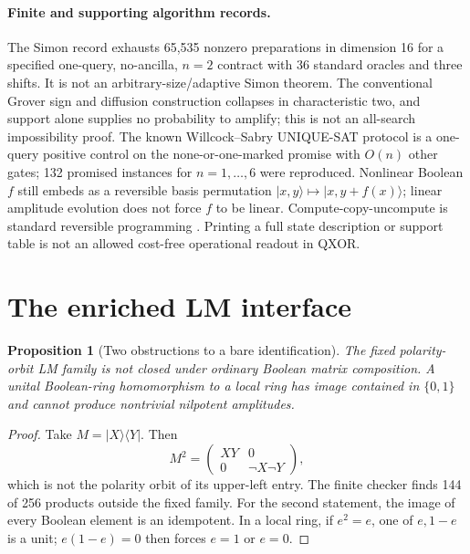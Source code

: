 \documentclass[11pt]{article}
\newtheorem{proposition}[theorem]{Proposition}
\theoremstyle{remark}
\begin{document}
\paragraph{Finite and supporting algorithm records.}
The Simon record exhausts 65,535 nonzero preparations in dimension 16 for a
specified one-query, no-ancilla, $n=2$ contract with 36 standard oracles and
three shifts. It is not an arbitrary-size/adaptive Simon theorem. The
conventional Grover sign and diffusion construction collapses in characteristic
two, and support alone supplies no probability to amplify; this is not an
all-search impossibility proof. The known Willcock--Sabry UNIQUE-SAT protocol
\cite{WillcockSabry2011} is a one-query positive control on the none-or-one-marked
promise with $O(n)$ other gates; 132 promised instances for $n=1,\ldots,6$ were
reproduced. Nonlinear Boolean $f$ still embeds as a reversible basis permutation
$\lvert x,y\rangle\mapsto\lvert x,y+f(x)\rangle$; linear amplitude evolution
does not force $f$ to be linear. Compute-copy-uncompute is standard reversible
programming \cite{Bennett1973,James2011}. Printing a full state description or
support table is not an allowed cost-free operational readout in QXOR.

\section{The enriched LM interface}
\label{sec:bridge}
\begin{proposition}[Two obstructions to a bare identification]
The fixed polarity-orbit LM family is not closed under ordinary Boolean matrix
composition. A unital Boolean-ring homomorphism to a local ring has image
contained in $\{0,1\}$ and cannot produce nontrivial nilpotent amplitudes.
\end{proposition}
\begin{proof}
Take $M=\lvert X\rangle\langle Y\rvert$. Then
\[
 M^2=\begin{pmatrix}XY&0\\0&\neg X\neg Y\end{pmatrix},
\]
which is not the polarity orbit of its upper-left entry. The finite checker
finds 144 of 256 products outside the fixed family. For the second statement,
the image of every Boolean element is an idempotent. In a local ring, if
$e^2=e$, one of $e,1-e$ is a unit; $e(1-e)=0$ then forces $e=1$ or $e=0$.
\end{proof}
\end{document}
